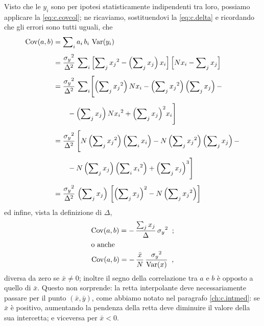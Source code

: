 Visto che le $y_i$ sono per ipotesi statisticamente
indipendenti tra loro, possiamo applicare la
\eqref{eq:c.covcol}; ne ricaviamo, sostituendovi la
\eqref{eq:c.delta} e ricordando che gli errori sono tutti
uguali, che
\begin{align*}
  \operatorname{Cov}( a, b ) &= \sum\nolimits_i a_i \, b_i \,
    \operatorname{Var}(y_i) \\[1ex]
  &= \frac{{\sigma_y}^2}{\Delta^2} \, \sum\nolimits_i
    \left[ \sum\nolimits_j {x_j}^2 - \left(
    \sum\nolimits_j x_j \right) x_i \right] \left[ N
    x_i - \sum\nolimits_j x_j \right] \\[1ex]
  &= \frac{{\sigma_y}^2}{\Delta^2} \, \sum\nolimits_i
    \Biggl[ \left( \sum\nolimits_j {x_j}^2 \right) N
    x_i - \left( \sum\nolimits_j {x_j}^2  \right)
    \left( \sum\nolimits_j x_j \right) -
    \\[1ex]
  &\qquad - \left( \sum\nolimits_j x_j \right) N
    {x_i}^2 + \left( \sum\nolimits_j x_j \right)^2 \!
    x_i \Biggr] \\[1ex]
  &= \frac{{\sigma_y}^2}{\Delta^2} \, \Biggl[ N \left(
    \sum\nolimits_j {x_j}^2 \right) \left(
    \sum\nolimits_i x_i \right) - N \left(
    \sum\nolimits_j {x_j}^2 \right) \left(
    \sum\nolimits_j x_j \right) - \\[1ex]
  &\qquad - N \left( \sum\nolimits_j x_j \right) \left(
    \sum\nolimits_i {x_i}^2 \right) + \left(
    \sum\nolimits_j x_j \right)^3 \Biggr]
    \\[1ex]
  &= \frac{{\sigma_y}^2}{\Delta^2} \, \left(
    \sum\nolimits_j x_j \right) \, \left[ \left(
    \sum\nolimits_j x_j \right)^2 - N \left(
    \sum\nolimits_j {x_j}^2 \right) \right]
\end{align*}
ed infine, vista la definizione di $\Delta$,
\begin{gather}%
\index{covarianza!dei coefficienti della retta interpolante}
  \cov( a, b ) = - \, \frac{\sum\nolimits_j
    x_j}{\Delta} \, {\sigma_y}^2 \peq ; \label{eq:c.covab} \\
  \intertext{o anche}
  \cov( a, b ) = - \, \frac{\bar x}{N} \,
    \frac{{\sigma_y}^2}{\var(x)} \peq , \notag
\end{gather}
diversa da zero se $\bar x \ne 0$; inoltre il segno della
correlazione tra $a$ e $b$ \`e opposto a quello di $\bar x$.
Questo non sorprende: la retta interpolante deve
necessariamente passare per il punto $(\bar x, \bar y)$,
come abbiamo notato nel paragrafo \ref{ch:c.intmed}: se
$\bar x$ \`e positivo, aumentando la pendenza della retta
deve diminuire il valore della sua intercetta; e viceversa
per $\bar x < 0$.

